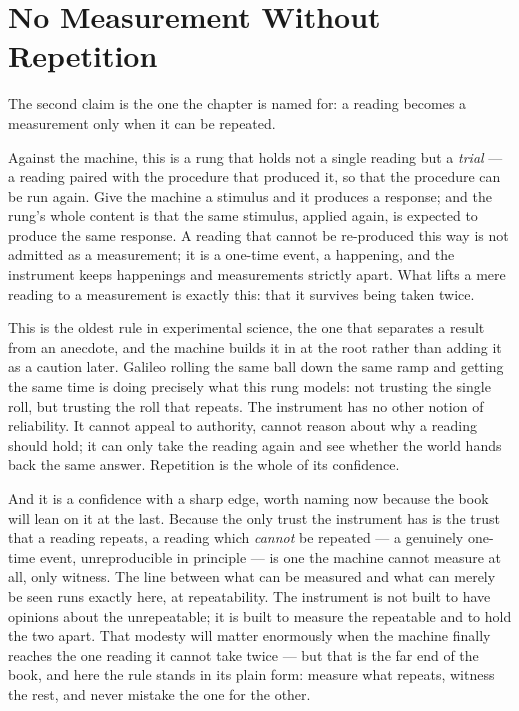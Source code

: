 \section{No Measurement Without Repetition}

The second claim is the one the chapter is named for: a reading becomes a measurement only when it can be
repeated.

Against the machine, this is a rung that holds not a single reading but a \emph{trial} --- a reading paired with
the procedure that produced it, so that the procedure can be run again. Give the machine a stimulus and it
produces a response; and the rung's whole content is that the same stimulus, applied again, is expected to
produce the same response. A reading that cannot be re-produced this way is not admitted as a measurement; it is
a one-time event, a happening, and the instrument keeps happenings and measurements strictly apart. What lifts a
mere reading to a measurement is exactly this: that it survives being taken twice.

This is the oldest rule in experimental science, the one that separates a result from an anecdote, and the
machine builds it in at the root rather than adding it as a caution later. Galileo rolling the same ball down the
same ramp and getting the same time is doing precisely what this rung models: not trusting the single roll, but
trusting the roll that repeats. The instrument has no other notion of reliability. It cannot appeal to
authority, cannot reason about why a reading should hold; it can only take the reading again and see whether the
world hands back the same answer. Repetition is the whole of its confidence.

And it is a confidence with a sharp edge, worth naming now because the book will lean on it at the last. Because
the only trust the instrument has is the trust that a reading repeats, a reading which \emph{cannot} be repeated
--- a genuinely one-time event, unreproducible in principle --- is one the machine cannot measure at all, only
witness. The line between what can be measured and what can merely be seen runs exactly here, at repeatability.
The instrument is not built to have opinions about the unrepeatable; it is built to measure the repeatable and to
hold the two apart. That modesty will matter enormously when the machine finally reaches the one reading it
cannot take twice --- but that is the far end of the book, and here the rule stands in its plain form: measure
what repeats, witness the rest, and never mistake the one for the other.

